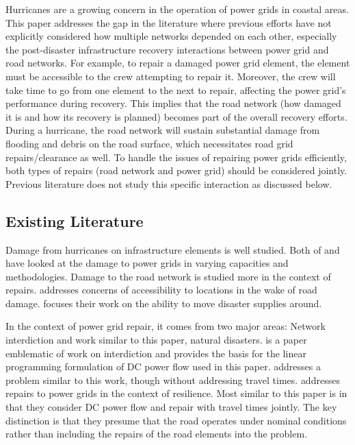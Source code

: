 \documentclass[10pt]{article}
\begin{document}
Hurricanes are a growing concern in the operation of power grids in coastal areas. This paper addresses the gap in the literature where previous efforts have not explicitly considered how multiple networks depended on each other, especially the post-disaster infrastructure recovery interactions between power grid and road networks. For example, to repair a damaged power grid element, the element must be accessible to the crew attempting to repair it. Moreover, the crew will take time to go from one element to the next to repair, affecting the power grid's performance during recovery. This implies that the road network (how damaged it is and how its recovery is planned) becomes part of the overall recovery efforts. During a hurricane, the road network will sustain substantial damage from flooding and debris on the road surface, which necessitates road grid repairs/clearance as well. To handle the issues of repairing power grids efficiently, both types of repairs (road network and power grid) should be considered jointly. Previous literature does not study this specific interaction as discussed below.
\vspace*{-12pt}
\subsection{\large Existing Literature}
\vspace*{-12pt}
Damage from hurricanes on infrastructure elements is well studied. Both of \cite{WinklerEA2010} and \cite{GuikemaEA2010} have looked at the damage to power grids in varying capacities and methodologies. Damage to the road network is studied more in the context of repairs. \cite{AksuEA2014} addresses concerns of accessibility to locations in the wake of road damage. \cite{DuqueEA2016} focuses their work on the ability to move disaster supplies around.

In the context of power grid repair, it comes from two major areas: Network interdiction and work similar to this paper, natural disasters. \cite{SalmeronEA2010} is a paper emblematic of work on interdiction and provides the basis for the linear programming formulation of DC power flow used in this paper.  \cite{NPSMasters} addresses a problem similar to this work, though without addressing travel times. \cite{ArabEA2015} addresses repairs to power grids in the context of resilience. Most similar to this paper is \cite{BentEA2011} in that they consider DC power flow and repair with travel times jointly. The key distinction is that they presume that the road operates under nominal conditions rather than including the repairs of the road elements into the problem.
\vspace*{-12pt}
\end{document}
